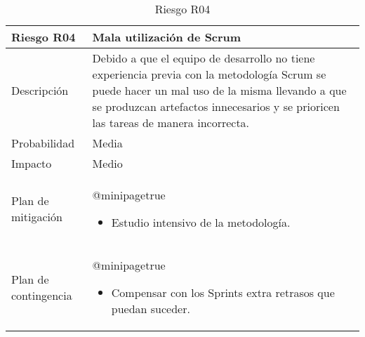 \begin{table}[]
	\centering
	\begin{tabularx}{\textwidth}{|l|X|}
		\hline
		\rowcolor[HTML]{C0C0C0} 
		\textbf{Riesgo R04}  & \textbf{Mala utilización de Scrum} \\ \hline
		Descripción          & Debido a que el equipo de desarrollo no tiene experiencia previa con la metodología Scrum se puede hacer un mal uso de la misma llevando a que se produzcan artefactos innecesarios y se prioricen las tareas de manera incorrecta. \\ \hline
		Probabilidad         & Media \\ \hline
		Impacto              & Medio \\ \hline
		Plan de mitigación   & \csname @minipagetrue\endcsname \begin{itemize}[leftmargin=*, noitemsep, topsep=0pt]
			\item Estudio intensivo de la metodología.
		\end{itemize} \\ \hline
		Plan de contingencia & \csname @minipagetrue\endcsname \begin{itemize}[leftmargin=*, noitemsep, topsep=0pt]
			\item Compensar con los Sprints extra retrasos que puedan suceder.
		\end{itemize} \\ \hline
	\end{tabularx}
	\caption{Riesgo R04}
	\label{riesgo_4}
\end{table}